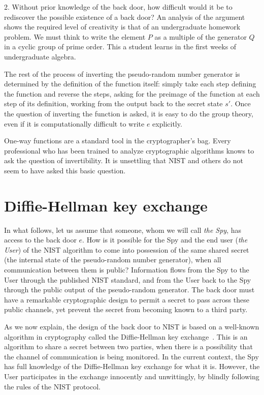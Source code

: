 \documentclass[11pt]{amsart} %
\begin{document}
2.  Without prior knowledge of the back door, how difficult would it
be to rediscover the possible existence of a back door?  An analysis of the argument shows the 
required level of creativity 
 is that of an undergraduate homework problem.  We must think
to write the element $P$ as a multiple of the generator $Q$ in a cyclic group of prime order. 
This a student learns in the first weeks of undergraduate algebra.
 
The rest of the process
of inverting the pseudo-random number generator is determined by the definition of the
function itself: simply take each step defining the function
and reverse the steps, asking for the preimage of the function at each step of its definition, working
from the output back to the secret state $s'$.
Once the question of inverting the function is asked, it is easy to do the group theory, even if it
is computationally difficult to write $e$ explicitly.

One-way functions are a standard tool in the cryptographer's bag.
Every professional who has been trained to analyze cryptographic algorithms knows to
ask the question of invertibility.  It is unsettling that NIST and others do not seem to have asked
 this basic question.


\section{Diffie-Hellman key exchange}

 In what follows, let us assume that someone, whom we will call {\it the Spy}, has access
to the back door $e$. How is it possible for the Spy and the end user ({\it the User}) of the NIST
algorithm to come into possession of the same shared secret (the internal state of the
pseudo-random number generator), when all communication between them is public?
Information flows from the Spy to the User through the published NIST standard, and from
the User back to the Spy through the public output of the pseudo-random generator.
The back door must have a remarkable cryptographic design to permit a secret to pass across 
these public channels, yet prevent the secret from becoming known to a third party.

As we now explain, the design of the back door to NIST is based
on a well-known algorithm in cryptography called
the Diffie-Hellman key exchange~\cite{DH}.  This is an algorithm to share a secret between two parties, when
there is a possibility that the channel of communication is being monitored.   
In the current context,
the Spy has full knowledge of the Diffie-Hellman key exchange for what it is.  However, the User
participates in the exchange innocently and unwittingly, by blindly 
following the rules of the NIST protocol.
\end{document}
